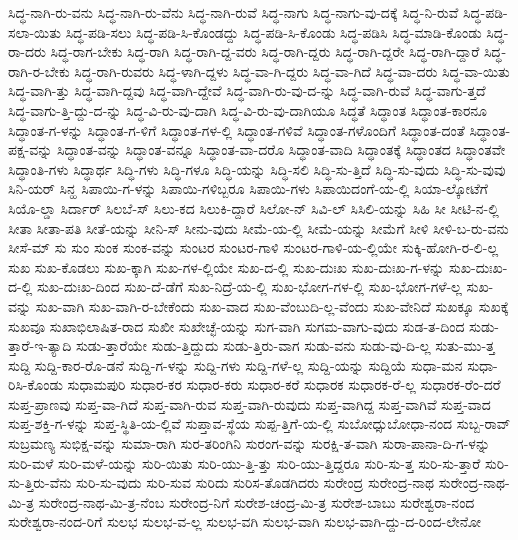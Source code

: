 {ಸಿದ್ಧ-ನಾಗಿ-ರು-ವನು
ಸಿದ್ಧ-ನಾಗಿ-ರು-ವೆನು
ಸಿದ್ಧ-ನಾಗಿ-ರುವೆ
ಸಿದ್ಧ-ನಾಗು
ಸಿದ್ಧ-ನಾಗು-ವು-ದಕ್ಕೆ
ಸಿದ್ಧ-ನಿ-ರುವೆ
ಸಿದ್ಧ-ಪಡಿ-ಸಲಾ-ಯಿತು
ಸಿದ್ಧ-ಪಡಿ-ಸಲು
ಸಿದ್ಧ-ಪಡಿ-ಸಿ-ಕೊಂಡದ್ದು
ಸಿದ್ಧ-ಪಡಿ-ಸಿ-ಕೊಂಡು
ಸಿದ್ಧ-ಪಡಿಸಿ
ಸಿದ್ಧ-ಮಾಡಿ-ಕೊಂಡು
ಸಿದ್ಧ-ರಾ-ದರು
ಸಿದ್ಧ-ರಾಗ-ಬೇಕು
ಸಿದ್ಧ-ರಾಗಿ
ಸಿದ್ಧ-ರಾಗಿ-ದ್ದ-ವರು
ಸಿದ್ಧ-ರಾಗಿ-ದ್ದರು
ಸಿದ್ಧ-ರಾಗಿ-ದ್ದರೇ
ಸಿದ್ಧ-ರಾಗಿ-ದ್ದಾರೆ
ಸಿದ್ಧ-ರಾಗಿ-ರ-ಬೇಕು
ಸಿದ್ಧ-ರಾಗಿ-ರುವರು
ಸಿದ್ಧ-ಳಾಗಿ-ದ್ದಳು
ಸಿದ್ಧ-ವಾ-ಗಿ-ದ್ದರು
ಸಿದ್ಧ-ವಾ-ಗಿದೆ
ಸಿದ್ಧ-ವಾ-ದರು
ಸಿದ್ಧ-ವಾ-ಯಿತು
ಸಿದ್ಧ-ವಾಗಿ-ತ್ತು
ಸಿದ್ಧ-ವಾಗಿ-ದ್ದವು
ಸಿದ್ಧ-ವಾಗಿ-ದ್ದೇವೆ
ಸಿದ್ಧ-ವಾಗಿ-ರು-ವು-ದ-ನ್ನು
ಸಿದ್ಧ-ವಾಗಿ-ರುವೆ
ಸಿದ್ಧ-ವಾಗು-ತ್ತದೆ
ಸಿದ್ಧ-ವಾಗು-ತ್ತಿ-ದ್ದು-ದ-ನ್ನು
ಸಿದ್ಧ-ವಿ-ರು-ವು-ದಾಗಿ
ಸಿದ್ಧ-ವಿ-ರು-ವು-ದಾಗಿಯೂ
ಸಿದ್ಧತೆ
ಸಿದ್ಧಾಂತ
ಸಿದ್ಧಾಂತ-ಕಾರನೂ
ಸಿದ್ಧಾಂತ-ಗ-ಳನ್ನು
ಸಿದ್ಧಾಂತ-ಗ-ಳಿಗೆ
ಸಿದ್ಧಾಂತ-ಗಳ-ಲ್ಲಿ
ಸಿದ್ಧಾಂತ-ಗಳಿವೆ
ಸಿದ್ಧಾಂತ-ಗಳೊಂದಿಗೆ
ಸಿದ್ಧಾಂತ-ದಂತೆ
ಸಿದ್ಧಾಂತ-ಪಕ್ಷ-ವನ್ನು
ಸಿದ್ಧಾಂತ-ವನ್ನು
ಸಿದ್ಧಾಂತ-ವನ್ನೂ
ಸಿದ್ಧಾಂತ-ವಾ-ದರೊ
ಸಿದ್ಧಾಂತ-ವಾದಿ
ಸಿದ್ಧಾಂತಕ್ಕೆ
ಸಿದ್ಧಾಂತದ
ಸಿದ್ಧಾಂತವೇ
ಸಿದ್ಧಾಂತಿ-ಗಳು
ಸಿದ್ಧಾರ್ಥ
ಸಿದ್ಧಿ-ಗಳು
ಸಿದ್ಧಿ-ಗಳೂ
ಸಿದ್ಧಿ-ಯನ್ನು
ಸಿದ್ಧಿ-ಸಲಿ
ಸಿದ್ಧಿ-ಸು-ತ್ತಿದೆ
ಸಿದ್ಧಿ-ಸು-ವುದು
ಸಿದ್ಧಿ-ಸು-ವುವು
ಸಿನಿ-ಯರ್
ಸಿನ್ಹ
ಸಿಪಾಯಿ-ಗ-ಳನ್ನು
ಸಿಪಾಯಿ-ಗಳಿಬ್ಬರೂ
ಸಿಪಾಯಿ-ಗಳು
ಸಿಪಾಯಿದಂಗೆ-ಯ-ಲ್ಲಿ
ಸಿಯಾ-ಲ್ಕೋಟೆಗೆ
ಸಿಯೊ-ಲ್ಡಾ
ಸಿರ್ದಾರ್
ಸಿಲಬೆ-ಸ್
ಸಿಲು-ಕದ
ಸಿಲುಕಿ-ದ್ದಾರೆ
ಸಿಲೋ-ನ್
ಸಿವಿ-ಲ್
ಸಿಸಿಲಿ-ಯನ್ನು
ಸಿಹಿ
ಸೀ
ಸೀಟಿ-ನ-ಲ್ಲಿ
ಸೀತಾ
ಸೀತಾ-ಪತಿ
ಸೀತೆ-ಯನ್ನು
ಸೀನಿ-ಸ್
ಸೀನು-ವುದು
ಸೀಮೆ-ಯ-ಲ್ಲಿ
ಸೀಮೆ-ಯನ್ನು
ಸೀಮೆಗೆ
ಸೀಳಿ
ಸೀಳಿ-ಬ-ರು-ವನು
ಸೀಸೆ-ಮ್
ಸು
ಸುಂ
ಸುಂಕ
ಸುಂಕ-ವನ್ನು
ಸುಂಟರ
ಸುಂಟರ-ಗಾಳಿ
ಸುಂಟರ-ಗಾಳಿ-ಯ-ಲ್ಲಿಯೇ
ಸುಕ್ಕಿ-ಹೋಗಿ-ರ-ಲಿ-ಲ್ಲ
ಸುಖ
ಸುಖ-ಕೊಡಲು
ಸುಖ-ಕ್ಕಾಗಿ
ಸುಖ-ಗಳ-ಲ್ಲಿಯೇ
ಸುಖ-ದ-ಲ್ಲಿ
ಸುಖ-ದುಃಖ
ಸುಖ-ದುಃಖ-ಗ-ಳನ್ನು
ಸುಖ-ದುಃಖ-ದ-ಲ್ಲಿ
ಸುಖ-ದುಃಖ-ದಿಂದ
ಸುಖ-ದೆ-ಡೆಗೆ
ಸುಖ-ನಿದ್ರೆ-ಯ-ಲ್ಲಿ
ಸುಖ-ಭೋಗ-ಗಳ-ಲ್ಲಿ
ಸುಖ-ಭೋಗ-ಗಳೆ-ಲ್ಲ
ಸುಖ-ವನ್ನು
ಸುಖ-ವಾಗಿ
ಸುಖ-ವಾಗಿ-ರ-ಬೇಕೆಂದು
ಸುಖ-ವಾದ
ಸುಖ-ವೆಂಬುದಿ-ಲ್ಲ-ವೆಂದು
ಸುಖ-ವೇನಿದೆ
ಸುಖಕ್ಕೂ
ಸುಖಕ್ಕೆ
ಸುಖವೂ
ಸುಖಾಭಿಲಾಷಿತ-ರಾದ
ಸುಖೀ
ಸುಖೇಚ್ಛೆ-ಯನ್ನು
ಸುಗ-ವಾಗಿ
ಸುಗಮ-ವಾಗು-ವುದು
ಸುಡ-ತ-ದಿಂದ
ಸುಡು-ತ್ತಾರೆ-ಇ-ತ್ಯಾದಿ
ಸುಡು-ತ್ತಾರೆಯೇ
ಸುಡು-ತ್ತಿದ್ದುದು
ಸುಡು-ತ್ತಿರು-ವಾಗ
ಸುಡು-ವನು
ಸುಡು-ವು-ದಿ-ಲ್ಲ
ಸುತು-ಮು-ತ್ತ
ಸುದ್ದಿ
ಸುದ್ದಿ-ಕಾರ-ರೊ-ಡನೆ
ಸುದ್ದಿ-ಗ-ಳನ್ನು
ಸುದ್ದಿ-ಗಳು
ಸುದ್ದಿ-ಗಳೆ-ಲ್ಲ
ಸುದ್ದಿ-ಯನ್ನು
ಸುದ್ದಿಯೆ
ಸುಧಾ-ಮನ
ಸುಧಾ-ರಿಸಿ-ಕೊಂಡು
ಸುಧಾಮಪುರಿ
ಸುಧಾರ-ಕರ
ಸುಧಾರ-ಕರು
ಸುಧಾರ-ಕರೆ
ಸುಧಾರಕ
ಸುಧಾರಕ-ರೆ-ಲ್ಲ
ಸುಧಾರಕ-ರೆಂ-ದರೆ
ಸುಪ್ತ-ಪ್ರಾಣವು
ಸುಪ್ತ-ವಾ-ಗಿದೆ
ಸುಪ್ತ-ವಾಗಿ-ರುವ
ಸುಪ್ತ-ವಾಗಿ-ರುವುದು
ಸುಪ್ತ-ವಾಗಿದ್ದ
ಸುಪ್ತ-ವಾಗಿವೆ
ಸುಪ್ತ-ವಾದ
ಸುಪ್ತ-ಶಕ್ತಿ-ಗ-ಳನ್ನು
ಸುಪ್ತ-ಸ್ಥಿತಿ-ಯ-ಲ್ಲಿವೆ
ಸುಪ್ತಾವ-ಸ್ಥೆಯ
ಸುಪ್ಪ-ತ್ತಿಗೆ-ಯ-ಲ್ಲಿ
ಸುಬೋಧ್ಸುಬೋಧಾ-ನಂದ
ಸುಬ್ಬ-ರಾವ್
ಸುಬ್ರಮಣ್ಯ
ಸುಭಿಕ್ಷ-ವನ್ನು
ಸುಮಾ-ರಾಗಿ
ಸುರ-ತರಿಂಗಿನಿ
ಸುರಂಗ-ವನ್ನು
ಸುರಕ್ಷಿ-ತ-ವಾಗಿ
ಸುರಾ-ಪಾನಾ-ದಿ-ಗ-ಳನ್ನು
ಸುರಿ-ಮಳೆ
ಸುರಿ-ಮಳೆ-ಯನ್ನು
ಸುರಿ-ಯಿತು
ಸುರಿ-ಯು-ತ್ತಿ-ತ್ತು
ಸುರಿ-ಯು-ತ್ತಿದ್ದರೂ
ಸುರಿ-ಸು-ತ್ತ
ಸುರಿ-ಸು-ತ್ತಾರೆ
ಸುರಿ-ಸು-ತ್ತಿರು-ವೆನು
ಸುರಿ-ಸು-ವುದು
ಸುರಿ-ಸುವ
ಸುರಿದು
ಸುರಿಸ-ತೊಡಗಿದರು
ಸುರೇಂದ್ರ
ಸುರೇಂದ್ರ-ನಾಥ
ಸುರೇಂದ್ರ-ನಾಥ-ಮಿ-ತ್ರ
ಸುರೇಂದ್ರ-ನಾಥ-ಮಿ-ತ್ರ-ನೆಂಬ
ಸುರೇಂದ್ರ-ನಿಗೆ
ಸುರೇಶ-ಚಂದ್ರ-ಮಿ-ತ್ರ
ಸುರೇಶ-ಬಾಬು
ಸುರೇಶ್ವರಾ-ನಂದ
ಸುರೇಶ್ವರಾ-ನಂದ-ರಿಗೆ
ಸುಲಭ
ಸುಲಭ-ವ-ಲ್ಲ
ಸುಲಭ-ವಗಿ
ಸುಲಭ-ವಾಗಿ
ಸುಲಭ-ವಾಗಿ-ದ್ದು-ದ-ರಿಂದ-ಲೇನೋ
}
